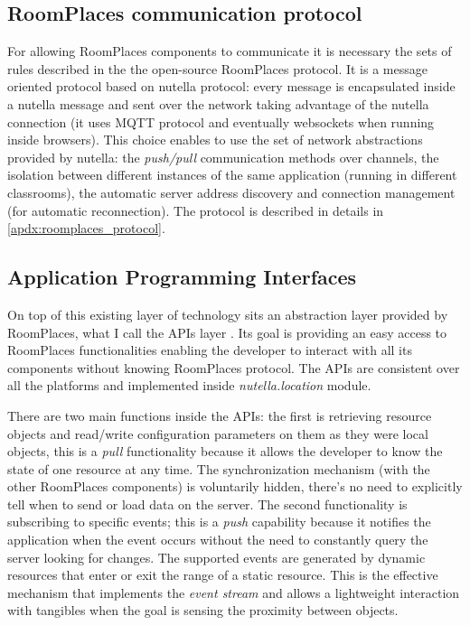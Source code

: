 \subsection{RoomPlaces communication protocol}
For allowing RoomPlaces components to communicate it is necessary the sets of rules described in the the open-source RoomPlaces protocol. It is a message oriented protocol based on nutella protocol: every message is encapsulated inside a nutella message and sent over the network taking advantage of the nutella connection (it uses MQTT protocol and eventually websockets when running inside browsers). This choice enables to use the set of network abstractions provided by nutella: the \textit{push/pull} communication methods over channels, the isolation between different instances of the same application (running in different classrooms), the automatic server address discovery and connection management (for automatic reconnection). The protocol is described in details in \autoref{apdx:roomplaces_protocol}.

\subsection{Application Programming Interfaces}
On top of this existing layer of technology sits an abstraction layer provided by RoomPlaces, what I call the APIs layer \cite{nutella_location}. Its goal is providing an easy access to RoomPlaces functionalities enabling the developer to interact with all its components without knowing RoomPlaces protocol. The APIs are consistent over all the platforms and implemented inside \textit{nutella.location} module.

There are two main functions inside the APIs: the first is retrieving resource objects and read/write configuration parameters on them as they were local objects, this is a \textit{pull} functionality because it allows the developer to know the state of one resource at any time. The synchronization mechanism (with the other RoomPlaces components) is voluntarily hidden, there's no need to explicitly tell when to send or load data on the server. The second functionality is subscribing to specific events; this is a \textit{push} capability because it notifies the application when the event occurs without the need to constantly query the server looking for changes. The supported events are generated by dynamic resources that enter or exit the range of a static resource. This is the effective mechanism that implements the \textit{event stream} and allows a lightweight interaction with tangibles when the goal is sensing the proximity between objects.

